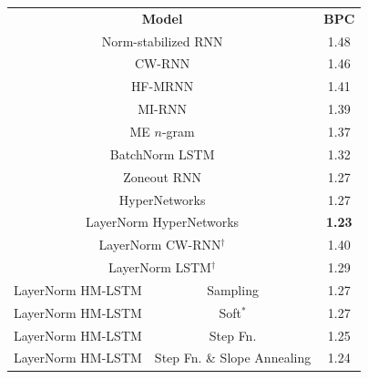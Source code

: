 \documentclass{article} %
\begin{document}
\begin{table}[t]
    \vspace*{-0.5cm}
    \hspace*{-1.2cm}
    {\small
    \begin{minipage}{0.4\textwidth}
        \begin{tabular}{c c c }
            \Xhline{0.8pt}
            \multicolumn{3}{c}{\bf Penn Treebank}\\
            \hline
            \multicolumn{2}{c}{\bf Model} & {\bf BPC} \\
            \hline
            \multicolumn{2}{c}{Norm-stabilized RNN}~\citep{krueger2015regularizing} & 1.48 \\
            \multicolumn{2}{c}{CW-RNN}~\citep{koutnik2014clockwork}                 & 1.46 \\
            \multicolumn{2}{c}{HF-MRNN}~\citep{mikolov2012subword}                  & 1.41 \\
            \multicolumn{2}{c}{MI-RNN}~\citep{wu2016multiplicative}                 & 1.39 \\
            \multicolumn{2}{c}{ME $n$-gram}~\citep{mikolov2012subword}              & 1.37 \\
            \multicolumn{2}{c}{BatchNorm LSTM}~\citep{cooijmans2016recurrent}       & 1.32 \\
            \multicolumn{2}{c}{Zoneout RNN}~\citep{krueger2016zoneout}              & 1.27 \\
            \multicolumn{2}{c}{HyperNetworks}~\citep{ha2016hypernetworks}           & 1.27 \\
            \multicolumn{2}{c}{LayerNorm HyperNetworks}~\citep{ha2016hypernetworks} & {\bf 1.23} \\
            \hline
            \multicolumn{2}{c}{LayerNorm CW-RNN$^\dagger$}                          & 1.40 \\
            \multicolumn{2}{c}{LayerNorm LSTM$^\dagger$}                            & 1.29 \\
            LayerNorm HM-LSTM & Sampling                                            & 1.27 \\
            LayerNorm HM-LSTM & Soft$^*$                                            & 1.27 \\
            LayerNorm HM-LSTM & Step Fn.                                            & 1.25 \\
            LayerNorm HM-LSTM & Step Fn. \& Slope Annealing                         & 1.24 \\

\end{tabular}
\end{minipage}}
\end{table}
\end{document}
